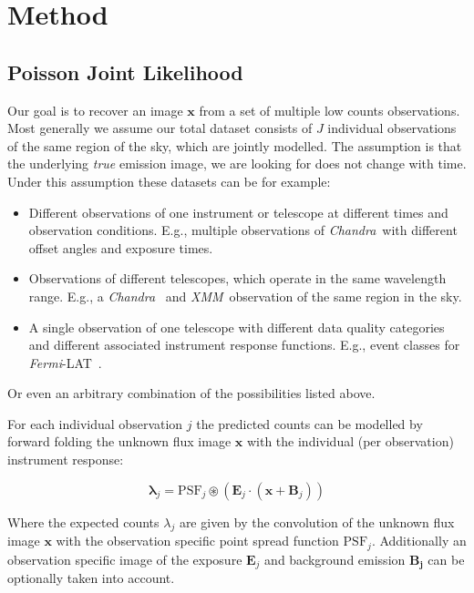 \documentclass[twocolumn]{aastex631}
\newcommand{\chandra}{\textit{Chandra}~}
\newcommand{\xmm}{\textit{XMM}~}
\newcommand{\fermi}{\textit{Fermi}-LAT~}
\begin{document}
    \section{Method}
    \subsection{Poisson Joint Likelihood}
    Our goal is to recover an image $\mathbf{x}$ from a set of multiple
    low counts observations.
    Most generally we assume our total dataset consists of $J$ individual
    observations of the same region of the sky, which are jointly
    modelled. The assumption is that the underlying \textit{true} emission image,
    we are looking for does not change with time. Under this assumption these
    datasets can be for example:

    \begin{itemize}
        \item Different observations of one instrument or telescope at different times and observation conditions. E.g., multiple observations of \chandra with different offset angles and exposure times.
        \item Observations of different telescopes, which operate in the same wavelength range. E.g., a \chandra
        and \xmm observation of the same region in the sky.
        \item A single observation of one telescope with different data quality categories and different associated instrument
        response functions. E.g., event classes for \fermi.
    \end{itemize}

    Or even an arbitrary combination of the possibilities listed above.

    For each individual observation $j$ the predicted counts can be modelled by forward
    folding the unknown flux image $\mathbf{x}$ with the individual (per observation) instrument response:

    \begin{equation}
        \label{eq:model}
        \boldsymbol{\lambda}_j = \mathrm{PSF}_j \circledast \left(\mathbf{E}_j \cdot (\mathbf{x} + \mathbf{B}_j) \right)
    \end{equation}

    Where the expected counts $\lambda_j$ are given by the convolution of the unknown 
    flux image $\mathbf{x}$ with the observation specific point spread function $\mathrm{PSF}_j$. Additionally
    an observation specific image of the exposure $\mathbf{E}_j$ and background emission $\mathbf{B_j}$ can be
    optionally taken into account.
\end{document}
